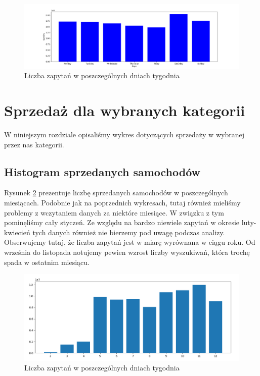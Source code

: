\documentclass[a4paper,11pt]{article}
\begin{document}
\begin{figure}[!ht]
\centering
\includegraphics[width=1.0\textwidth]{images/liczba_zapytan_w_dniach_tygodnia.png}
\caption{\label{fig:zapytaniaDni} Liczba zapytań w poszczególnych dniach tygodnia}
\end{figure}

\section{Sprzedaż dla wybranych kategorii}
W niniejszym rozdziale opisaliśmy wykres dotyczących sprzedaży w wybranej przez nas kategorii.

\subsection{Histogram sprzedanych samochodów}

Rysunek \ref{fig:sprzedaneSamochody} prezentuje liczbę sprzedanych samochodów w poszczególnych miesiącach. Podobnie jak na poprzednich wykresach, tutaj również mieliśmy problemy z wczytaniem danych za niektóre miesiące. W związku z tym pominęliśmy cały styczeń. Ze względu na bardzo niewiele zapytań w okresie luty-kwiecień tych danych również nie bierzemy pod uwagę podczas analizy. Obserwujemy tutaj, że liczba zapytań jest w miarę wyrównana w ciągu roku. Od września do listopada notujemy pewien wzrost liczby wyszukiwań, która trochę spada w ostatnim miesiącu.

\begin{figure}[!ht]
\centering
\includegraphics[width=1.0\textwidth]{images/sprzedane_samochody.png}
\caption{\label{fig:sprzedaneSamochody} Liczba zapytań w poszczególnych dniach tygodnia}
\end{figure}
\end{document}
